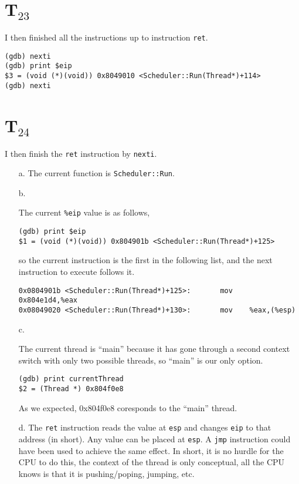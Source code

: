 \documentclass[letterpaper, 10pt]{article}
\begin{document}
	\section*{T$_{23}$}

	I then finished all the instructions up to instruction {\tt ret}.

	\begin{verbatim}
(gdb) nexti
(gdb) print $eip
$3 = (void (*)(void)) 0x8049010 <Scheduler::Run(Thread*)+114>
(gdb) nexti
	\end{verbatim}

	\section*{T$_{24}$}

	I then finish the {\tt ret} instruction by {\tt nexti}.

	\begin{itemize}
		\item[a.]{
		The current function is {\tt Scheduler::Run}.
		}
		\item[b.]{

		The current {\tt \%eip} value is as follows,

		\begin{verbatim}
(gdb) print $eip
$1 = (void (*)(void)) 0x804901b <Scheduler::Run(Thread*)+125>
		\end{verbatim}

		so the current instruction is the first in the following list, and the next instruction to execute follows it.
		\begin{verbatim}
0x0804901b <Scheduler::Run(Thread*)+125>:       mov    0x804e1d4,%eax
0x08049020 <Scheduler::Run(Thread*)+130>:       mov    %eax,(%esp)
		\end{verbatim}
		}
		\item[c.]{

		The current thread is ``main'' because it has gone through a second context switch with only two possible threads, so ``main'' is our only option.

		\begin{verbatim}
(gdb) print currentThread
$2 = (Thread *) 0x804f0e8
		\end{verbatim}

		As we expected, 0x804f0e8 coresponds to the ``main'' thread.
		}
		\item[d.]{
		The {\tt ret} instruction reads the value at {\tt esp} and changes {\tt eip} to that address (in short). Any value can be placed at {\tt esp}. A {\tt jmp} instruction could have been used to achieve the same effect. In short, it is no hurdle for the CPU to do this, the context of the thread is only conceptual, all the CPU knows is that it is pushing/poping, jumping, etc.
		}
	\end{itemize}
\end{document}
